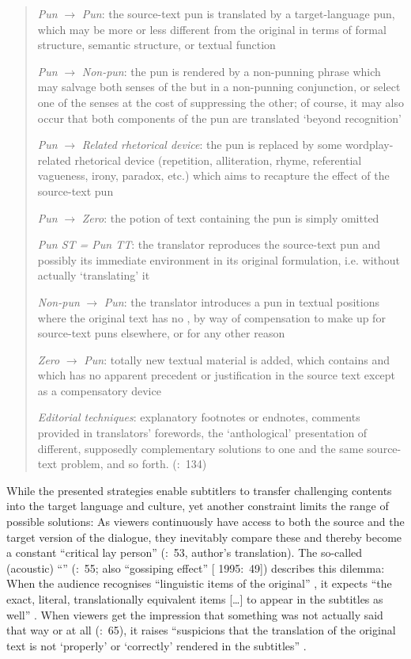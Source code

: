 \begin{quote}
\textit{Pun} $\rightarrow$ \textit{Pun}: the source-text pun is translated by a target-language pun, which may be more or less different from the original  in terms of formal structure, semantic structure, or textual function

\textit{Pun} $\rightarrow$ \textit{Non-pun}: the pun is rendered by a non-punning phrase which may salvage both senses of the  but in a non-punning conjunction, or select one of the senses at the cost of suppressing the other; of course, it may also occur that both components of the pun are translated ‘beyond recognition’

\textit{Pun} $\rightarrow$ \textit{Related rhetorical device}: the pun is replaced by some wordplay-related rhetorical device (repetition, alliteration, rhyme, referential vagueness, irony, paradox, etc.) which aims to recapture the effect of the source-text pun

\textit{Pun} $\rightarrow$ \textit{Zero}: the potion of text containing the pun is simply omitted

\textit{Pun ST = Pun TT}: the translator reproduces the source-text pun and possibly its immediate environment in its original formulation, i.e. without actually ‘translating’ it

\textit{Non-pun} $\rightarrow$ \textit{Pun}: the translator introduces a pun in textual positions where the original text has no , by way of compensation to make up for source-text puns elsewhere, or for any other reason

\textit{Zero} $\rightarrow$ \textit{Pun}: totally new textual material is added, which contains  and which has no apparent precedent or justification in the source text except as a compensatory device

\textit{Editorial techniques}: explanatory footnotes or endnotes, comments provided in translators’ forewords, the ‘anthological’ presentation of different, supposedly complementary solutions to one and the same source-text problem, and so forth. (\citealt{Delabastita1996}:~134)
\end{quote}

\largerpage
While the presented strategies enable subtitlers to transfer challenging contents into the target language and culture, yet another constraint limits the range of possible solutions: As viewers continuously have access to both the source and the target version of the dialogue, they inevitably compare these and thereby become a constant “critical lay person” (\citealt{Jungst2010}:~53, author’s translation). The so-called (acoustic) “” (\citealt{Diaz_cintas2007}:~55; also “gossiping effect” [\citealt{Tornqvist1995} 1995:~49]) describes this dilemma: When the audience recognises “linguistic items of the original” \citep{Karamitroglou1998}, it expects “the exact, literal, translationally equivalent items […] to appear in the subtitles as well” \citep{Karamitroglou1998}. When viewers get the impression that something was not actually said that way or at all (\citealt{nagel2009}:~65), it raises “suspicions that the translation of the original text is not ‘properly’ or ‘correctly’ rendered in the subtitles” \citep{Karamitroglou1998}.

